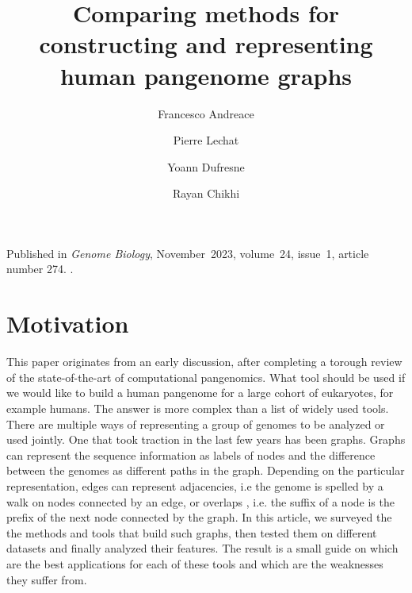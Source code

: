 \author
{
    Francesco Andreace
    \and
    Pierre Lechat
    \and
    Yoann Dufresne
    \and
    Rayan Chikhi
}
\title{Comparing methods for constructing and representing human pangenome graphs}
\metadata
{
    Published in \emph{Genome Biology},
    November~2023,
    volume~24,
    issue~1,
    article number 274.
    .
}
\maketitle
\label{pap:gb_pdf}

\section{Motivation}
This paper originates from an early discussion, after completing a torough review of the state-of-the-art of computational pangenomics. What tool should be used if we would like to build a human pangenome for a large cohort of eukaryotes, for example humans. The answer is more complex than a list of widely used tools. There are multiple ways of representing a group of genomes to be analyzed or used jointly. One that took traction in the last few years has been graphs. Graphs can represent the sequence information as labels of nodes and the difference between the genomes as different paths in the graph. Depending on the particular representation, edges can represent adjacencies, i.e the genome is spelled by a walk on nodes connected by an edge, or overlaps , i.e. the suffix of a node is the prefix of the next node connected by the graph. In this article, we surveyed the the methods and tools that build such graphs, then tested them on different datasets and finally analyzed their features. The result is a small guide on which are the best applications for each of these tools and which are the weaknesses they suffer from.



